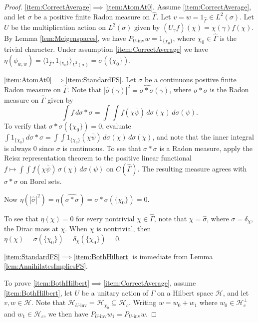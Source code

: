 \documentclass[12pt]{amsart} \usepackage{amsmath,centernot,amssymb,leftindex}
\numberwithin{theorem}{section}
\numberwithin{equation}{section}
\theoremstyle{definition}
\begin{document}
\begin{proof}
	\ref{item:CorrectAverage}$\implies$\ref{item:AtomAt0}.	Assume \ref{item:CorrectAverage}, and let $\sigma$ be a positive finite Radon measure on $\widehat{\Gamma}$.  Let $v=w=1_{\widehat{\Gamma}}\in L^{2}(\sigma)$.  Let $U$ be the multiplication action on $L^{2}(\sigma)$ given by  $(U_{\gamma }f)(\chi)=\chi(\gamma)f(\chi)$.  By Lemma \ref{lem:Meigenspaces}, we have $P_{U\text{-inv}}w=1_{\{\chi_{0}\}}$, where $\chi_{0}\in \widehat{\Gamma}$ is the trivial character.  Under assumption \ref{item:CorrectAverage} we have $\eta(\phi_{w,w})= \langle 1_{\widehat{\Gamma}}, 1_{\{\chi_{0}\}}\rangle_{L^{2}(\sigma)} = \sigma(\{\chi_{0}\})$.
	
	
	\ref{item:AtomAt0}$\implies$\ref{item:StandardFS}.	Let $\sigma$ be a continuous positive finite Radon measure on $\widehat{\Gamma}$.  Note that $|\hat{\sigma}(\gamma)|^{2}=\widehat{\sigma*\sigma}(\gamma)$, where $\sigma*\sigma$ is the Radon measure on $\widehat{\Gamma}$ given by
	\[
	\int f\, d\sigma*\sigma = \int \int f(\chi\overline{\psi})\, d\sigma(\chi)\, d\sigma(\psi).\] To verify that  $\sigma*\sigma(\{\chi_{0}\})=0$, evaluate $\int 1_{\{\chi_{0}\}}\, d \sigma*\sigma= \int \int 1_{\{\chi_{0}\}}(\chi \overline{\psi})\, d\sigma(\chi)\, d\sigma(\chi)$, and note that the inner integral is always $0$ since $\sigma$ is continuous.  To see that $\sigma*\sigma$ is a Radon measure, apply the Reisz representation theorem to the positive linear functional $f\mapsto \int \int f(\chi\overline{\psi})\, \sigma(\chi)\, d\sigma(\psi)$ on $C(\widehat{\Gamma})$.  The resulting measure agrees with $\sigma*\sigma$ on Borel sets.
	
	Now $\eta(|\hat{\sigma}|^{2})=\eta(\widehat{\sigma*\sigma})=\sigma*\sigma (\{\chi_{0}\})=0$.
	
	To see that $\eta(\chi)=0$ for every nontrivial $\chi\in\widehat{\Gamma}$, note that $\chi=\hat{\sigma}$, where $\sigma=\delta_{\chi}$, the Dirac mass at $\chi$.  When $\chi$ is nontrivial, then $\eta(\chi)=\sigma(\{\chi_{0}\})=\delta_{\chi}(\{\chi_{0}\})=0$.
	
	\ref{item:StandardFS}$\implies$\ref{item:BothHilbert} is immediate from Lemma \ref{lem:AnnihilatesImpliesFS}.
	
	
	
	To prove \ref{item:BothHilbert}$\implies$\ref{item:CorrectAverage},	assume \ref{item:BothHilbert}, let $U$ be a unitary action of $\Gamma$ on a Hilbert space $\mathcal H$, and let $v, w\in \mathcal H$.  Note that $\mathcal H_{U\text{-inv}} = \mathcal H_{\chi_{0}}\subseteq \mathcal H_{c}$.  Writing $w=w_{0}+w_{1}$ where $w_{0}\in \mathcal H_{c}^{\perp}$ and $w_{1}\in \mathcal H_{c}$, we then have $P_{U\text{-inv}}w_{1}=P_{U\text{-inv}} w$.
	

\end{proof}
\end{document}
